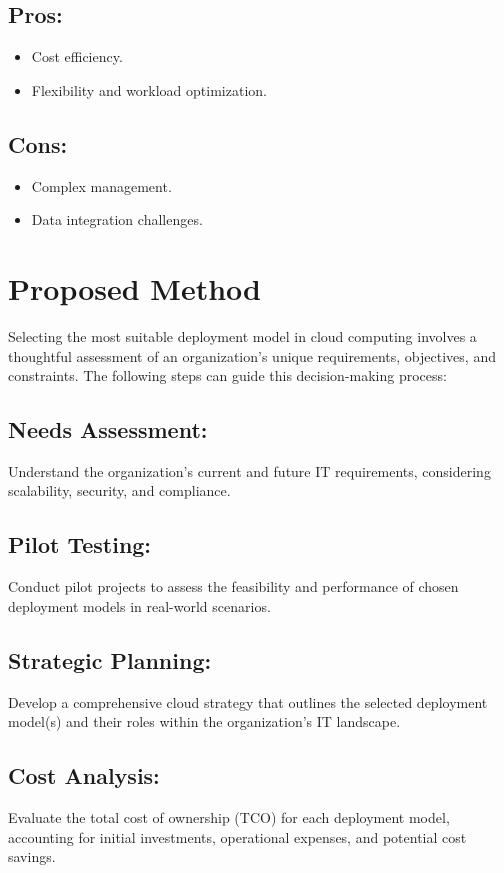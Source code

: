 \documentclass[12pt]{report}
\begin{document}
\subsection*{Pros:}
\begin{itemize}
    \item Cost efficiency.
    \item Flexibility and workload optimization.
\end{itemize}
\subsection*{Cons:}
\begin{itemize}
    \item Complex management.
    \item Data integration challenges.
\end{itemize}

\newpage
\section*{Proposed Method}
Selecting the most suitable deployment model in cloud computing involves a thoughtful assessment of an organization's unique requirements, objectives, and constraints. The following steps can guide this decision-making process:\cite{challenges}
\subsection*{Needs Assessment: } Understand the organization's current and future IT requirements, considering scalability, security, and compliance.
\subsection*{Pilot Testing: } Conduct pilot projects to assess the feasibility and performance of chosen deployment models in real-world scenarios.
\subsection*{Strategic Planning:} Develop a comprehensive cloud strategy that outlines the selected deployment model(s) and their roles within the organization's IT landscape.
\subsection*{Cost Analysis:}  Evaluate the total cost of ownership (TCO) for each deployment model, accounting for initial investments, operational expenses, and potential cost savings.
\end{document}
